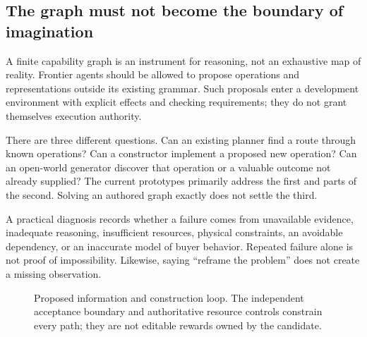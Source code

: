 \documentclass[11pt,letterpaper]{article}
\theoremstyle{remark}\newtheorem{remark}{Remark}[section]
\begin{document}
\subsection{The graph must not become the boundary of imagination}
A finite capability graph is an instrument for reasoning, not an exhaustive map of reality. Frontier agents should be allowed to propose operations and representations outside its existing grammar. Such proposals enter a development environment with explicit effects and checking requirements; they do not grant themselves execution authority.

There are three different questions. Can an existing planner find a route through known operations? Can a constructor implement a proposed new operation? Can an open-world generator discover that operation or a valuable outcome not already supplied? The current prototypes primarily address the first and parts of the second. Solving an authored graph exactly does not settle the third.

A practical diagnosis records whether a failure comes from unavailable evidence, inadequate reasoning, insufficient resources, physical constraints, an avoidable dependency, or an inaccurate model of buyer behavior. Repeated failure alone is not proof of impossibility. Likewise, saying ``reframe the problem'' does not create a missing observation.

\begin{figure}[H]
\centering
{}
\caption{Proposed information and construction loop. The independent acceptance boundary and authoritative resource controls constrain every path; they are not editable rewards owned by the candidate.}
\end{figure}
\end{document}
